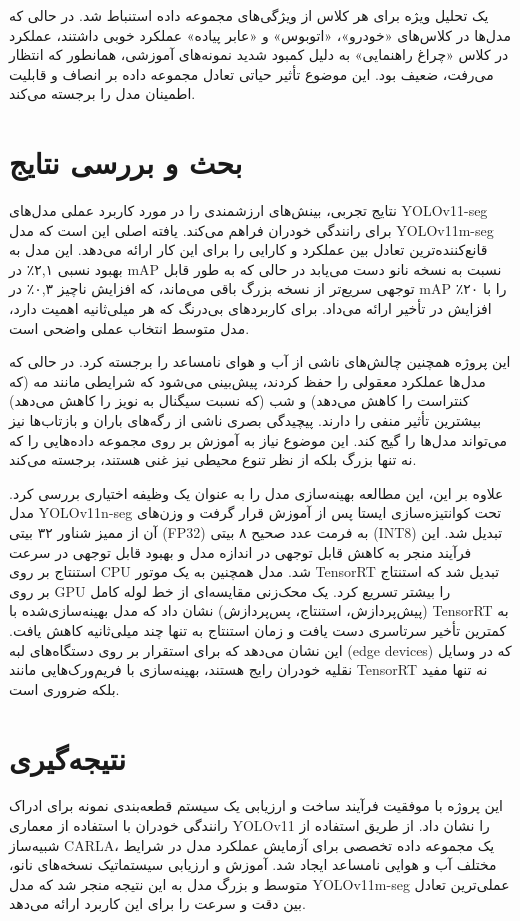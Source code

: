 \documentclass[oneside]{report}
\begin{document}
یک تحلیل ویژه برای هر کلاس از ویژگی‌های مجموعه داده استنباط شد. در حالی که مدل‌ها در کلاس‌های «خودرو»، «اتوبوس» و «عابر پیاده» عملکرد خوبی داشتند، عملکرد در کلاس «چراغ راهنمایی» به دلیل کمبود شدید نمونه‌های آموزشی، همانطور که انتظار می‌رفت، ضعیف بود. این موضوع تأثیر حیاتی تعادل مجموعه داده بر انصاف و قابلیت اطمینان مدل را برجسته می‌کند.

\chapter{بحث و بررسی نتایج}
نتایج تجربی، بینش‌های ارزشمندی را در مورد کاربرد عملی مدل‌های YOLOv11-seg برای رانندگی خودران فراهم می‌کند. یافته اصلی این است که مدل YOLOv11m-seg قانع‌کننده‌ترین تعادل بین عملکرد و کارایی را برای این کار ارائه می‌دهد. این مدل به بهبود نسبی ۲,۱٪ در mAP نسبت به نسخه نانو دست می‌یابد در حالی که به طور قابل توجهی سریع‌تر از نسخه بزرگ باقی می‌ماند، که افزایش ناچیز ۰,۳٪ در mAP را با ۲۰٪ افزایش در تأخیر ارائه می‌داد. برای کاربردهای بی‌درنگ که هر میلی‌ثانیه اهمیت دارد، مدل متوسط انتخاب عملی واضحی است.

این پروژه همچنین چالش‌های ناشی از آب و هوای نامساعد را برجسته کرد. در حالی که مدل‌ها عملکرد معقولی را حفظ کردند، پیش‌بینی می‌شود که شرایطی مانند مه (که کنتراست را کاهش می‌دهد) و شب (که نسبت سیگنال به نویز را کاهش می‌دهد) بیشترین تأثیر منفی را دارند. پیچیدگی بصری ناشی از رگه‌های باران و بازتاب‌ها نیز می‌تواند مدل‌ها را گیج کند. این موضوع نیاز به آموزش بر روی مجموعه داده‌هایی را که نه تنها بزرگ بلکه از نظر تنوع محیطی نیز غنی هستند، برجسته می‌کند.

علاوه بر این، این مطالعه بهینه‌سازی مدل را به عنوان یک وظیفه اختیاری بررسی کرد. مدل YOLOv11n-seg تحت کوانتیزه‌سازی ایستا پس از آموزش قرار گرفت و وزن‌های آن از ممیز شناور ۳۲ بیتی (FP32) به فرمت عدد صحیح ۸ بیتی (INT8) تبدیل شد. این فرآیند منجر به کاهش قابل توجهی در اندازه مدل و بهبود قابل توجهی در سرعت استنتاج بر روی CPU شد. مدل همچنین به یک موتور TensorRT تبدیل شد که استنتاج بر روی GPU را بیشتر تسریع کرد. یک محک‌زنی مقایسه‌ای از خط لوله کامل (پیش‌پردازش، استنتاج، پس‌پردازش) نشان داد که مدل بهینه‌سازی‌شده با TensorRT به کمترین تأخیر سرتاسری دست یافت و زمان استنتاج به تنها چند میلی‌ثانیه کاهش یافت. این نشان می‌دهد که برای استقرار بر روی دستگاه‌های لبه (edge devices) که در وسایل نقلیه خودران رایج هستند، بهینه‌سازی با فریم‌ورک‌هایی مانند TensorRT نه تنها مفید بلکه ضروری است.

\chapter{نتیجه‌گیری}
این پروژه با موفقیت فرآیند ساخت و ارزیابی یک سیستم قطعه‌بندی نمونه برای ادراک رانندگی خودران با استفاده از معماری YOLOv11 را نشان داد. از طریق استفاده از شبیه‌ساز CARLA، یک مجموعه داده تخصصی برای آزمایش عملکرد مدل در شرایط مختلف آب و هوایی نامساعد ایجاد شد. آموزش و ارزیابی سیستماتیک نسخه‌های نانو، متوسط و بزرگ مدل به این نتیجه منجر شد که مدل YOLOv11m-seg عملی‌ترین تعادل بین دقت و سرعت را برای این کاربرد ارائه می‌دهد.
\end{document}
